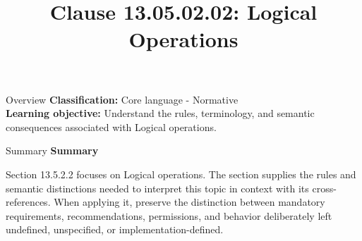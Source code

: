 \documentclass[10pt,letterpaper]{article}
\title{Clause 13.05.02.02: Logical Operations}
\author{}
\date{}
\begin{document}
\maketitle
\begin{CornellOverviewBox}{Overview}
\textbf{Classification:} Core language - Normative\\[2pt]
\textbf{Learning objective:} Understand the rules, terminology, and semantic consequences associated with Logical operations.
\end{CornellOverviewBox}\begin{CornellSummaryBox}{Summary}
{\sffamily\bfseries\color{Accent} Summary}\par\vspace{3pt}Section 13.5.2.2 focuses on Logical operations. The section supplies the rules and semantic distinctions needed to interpret this topic in context with its cross-references. When applying it, preserve the distinction between mandatory requirements, recommendations, permissions, and behavior deliberately left undefined, unspecified, or implementation-defined.
\end{CornellSummaryBox}
\end{document}
